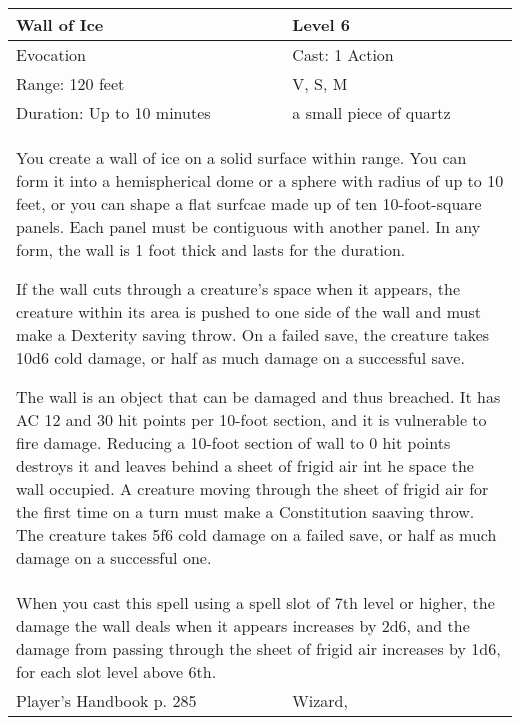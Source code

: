 \documentclass[11pt]{report}
\begin{document}
\begin{table}[H]
	\begin{tabular}{||p{6cm}|p{6cm}||}
		\hline\hline
		\bf{Wall of Ice} & Level 6\\ \hline
		Evocation & Cast: 1 Action\\ \hline
		Range: 120 feet & V, S, M\\ \hline
		Duration: Up to 10 minutes & a small piece of quartz\\ \hline
		\multicolumn{2}{||p{12cm}||}{You create a wall of ice on a solid surface within range. You can form it into a hemispherical dome or a sphere with radius of up to 10 feet, or you can shape a flat surfcae made up of ten 10-foot-square panels. Each panel must be contiguous with another panel. In any form, the wall is 1 foot thick and lasts for the duration.

If the wall cuts through a creature’s space when it appears, the creature within its area is pushed to one side of the wall and must make a Dexterity saving throw. On a failed save, the creature takes 10d6 cold damage, or half as much damage on a successful save.

The wall is an object that can be damaged and thus breached. It has AC 12 and 30 hit points per 10-foot section, and it is vulnerable to fire damage. Reducing a 10-foot section of wall to 0 hit points destroys it and leaves behind a sheet of frigid air int he space the wall occupied. A creature moving through the sheet of frigid air for the first time on a turn must make a Constitution saaving throw. The creature takes 5f6 cold damage on a failed save, or half as much damage on a successful one.}\\ \hline
		\multicolumn{2}{||p{12cm}||}{When you cast this spell using a spell slot of 7th level or higher, the damage the wall deals when it appears increases by 2d6, and the damage from passing through the sheet of frigid air increases by 1d6, for each slot level above 6th.}\\ \hline
Player's Handbook p. 285 & Wizard, \\ \hline\hline
	\end{tabular}
\end{table}
\end{document}
